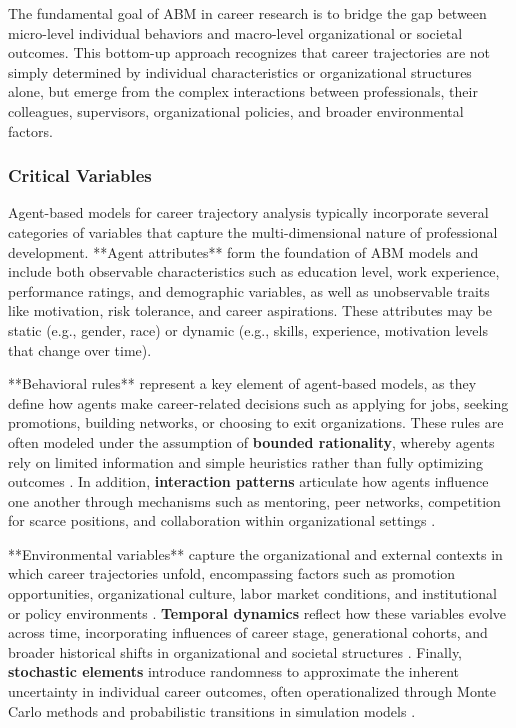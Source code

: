 \documentclass[main.tex]{subfiles}
\begin{document}
The fundamental goal of ABM in career research is to bridge the gap between micro-level individual behaviors and macro-level organizational or societal outcomes. This bottom-up approach recognizes that career trajectories are not simply determined by individual characteristics or organizational structures alone, but emerge from the complex interactions between professionals, their colleagues, supervisors, organizational policies, and broader environmental factors\parencite{complexity_explorer,fourweekmba}.

\subsubsection{Critical Variables}

Agent-based models for career trajectory analysis typically incorporate several categories of variables that capture the multi-dimensional nature of professional development. **Agent attributes** form the foundation of ABM models and include both observable characteristics such as education level, work experience, performance ratings, and demographic variables, as well as unobservable traits like motivation, risk tolerance, and career aspirations\parencite{columbia_abm,graduate_attrition}. These attributes may be static (e.g., gender, race) or dynamic (e.g., skills, experience, motivation levels that change over time).

**Behavioral rules** represent a key element of agent-based models, as they define how agents make career-related decisions such as applying for jobs, seeking promotions, building networks, or choosing to exit organizations. These rules are often modeled under the assumption of \textbf{bounded rationality}, whereby agents rely on limited information and simple heuristics rather than fully optimizing outcomes \parencite{march1978,simon1990,bonabeau2002}. In addition, \textbf{interaction patterns} articulate how agents influence one another through mechanisms such as mentoring, peer networks, competition for scarce positions, and collaboration within organizational settings \parencite{carley1992,macy2002,miller2007}.

**Environmental variables** capture the organizational and external contexts in which career trajectories unfold, encompassing factors such as promotion opportunities, organizational culture, labor market conditions, and institutional or policy environments \parencite{carley1992,macy2002}. \textbf{Temporal dynamics} reflect how these variables evolve across time, incorporating influences of career stage, generational cohorts, and broader historical shifts in organizational and societal structures \parencite{miller2007}. Finally, \textbf{stochastic elements} introduce randomness to approximate the inherent uncertainty in individual career outcomes, often operationalized through Monte Carlo methods and probabilistic transitions in simulation models \parencite{bonabeau2002,miller2007}.
\end{document}
